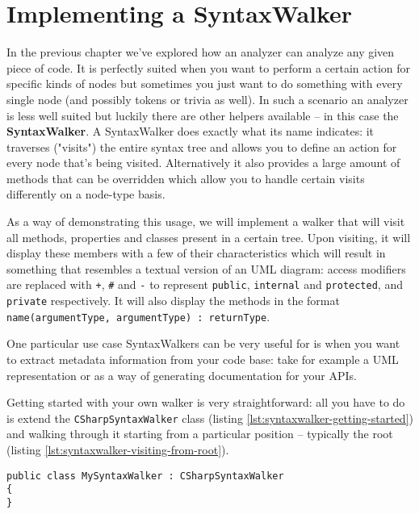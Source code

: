 \chapter{Implementing a SyntaxWalker}
\label{sec:syntaxwalker}

In the previous chapter we've explored how an analyzer can analyze any given piece of code. It is perfectly suited when you want to perform a certain action for specific kinds of nodes but sometimes you just want to do something with every single node (and possibly tokens or trivia as well). In such a scenario an analyzer is less well suited but luckily there are other helpers available -- in this case the \textbf{SyntaxWalker}. A SyntaxWalker does exactly what its name indicates: it traverses ("visits") the entire syntax tree and allows you to define an action for every node that's being visited. Alternatively it also provides a large amount of methods that can be overridden which allow you to handle certain visits differently on a node-type basis. 

As a way of demonstrating this usage, we will implement a walker that will visit all methods, properties and classes present in a certain tree. Upon visiting, it will display these members with a few of their characteristics which will result in something that resembles a textual version of an UML diagram: access modifiers are replaced with \texttt{+}, \texttt{\#} and \texttt{-} to represent \texttt{public}, \texttt{internal} and \texttt{protected}, and \texttt{private} respectively. It will also display the methods in the format \texttt{name(argumentType, argumentType) : returnType}.

One particular use case SyntaxWalkers can be very useful for is when you want to extract metadata information from your code base: take for example a UML representation or as a way of generating documentation for your APIs.

Getting started with your own walker is very straightforward: all you have to do is extend the \texttt{CSharpSyntaxWalker} class (listing \ref{lst:syntaxwalker-getting-started}) and walking through it starting from a particular position -- typically the root (listing \ref{lst:syntaxwalker-visiting-from-root}).

\begin{lstlisting}[label={lst:syntaxwalker-getting-started}]
public class MySyntaxWalker : CSharpSyntaxWalker
{
}
\end{lstlisting}

